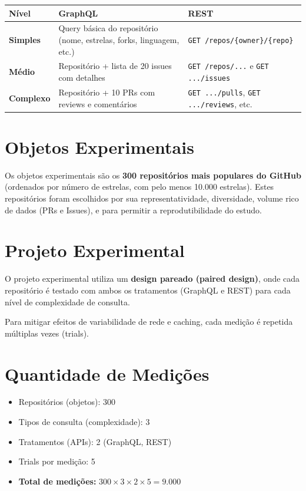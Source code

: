 \documentclass[12pt, a4paper]{article}
\begin{document}
\begin{table}[h]
\centering
\begin{tabularx}{\textwidth}{l X X}
\toprule
\textbf{Nível} & \textbf{GraphQL} & \textbf{REST} \\
\midrule
\textbf{Simples} & Query básica do repositório (nome, estrelas, forks, linguagem, etc.) & \texttt{GET /repos/\{owner\}/\{repo\}} \\
\textbf{Médio} & Repositório + lista de 20 issues com detalhes & \texttt{GET /repos/...} e \texttt{GET .../issues} \\
\textbf{Complexo} & Repositório + 10 PRs com reviews e comentários & \texttt{GET .../pulls}, \texttt{GET .../reviews}, etc. \\
\bottomrule
\end{tabularx}
\end{table}

\section{Objetos Experimentais}

Os objetos experimentais são os \textbf{300 repositórios mais populares do GitHub} (ordenados por número de estrelas, com pelo menos 10.000 estrelas). Estes repositórios foram escolhidos por sua representatividade, diversidade, volume rico de dados (PRs e Issues), e para permitir a reprodutibilidade do estudo.

\section{Projeto Experimental}

O projeto experimental utiliza um \textbf{design pareado (paired design)}, onde cada repositório é testado com ambos os tratamentos (GraphQL e REST) para cada nível de complexidade de consulta.

Para mitigar efeitos de variabilidade de rede e caching, cada medição é repetida múltiplas vezes (trials).

\section{Quantidade de Medições}

\begin{itemize}
    \item Repositórios (objetos): 300
    \item Tipos de consulta (complexidade): 3
    \item Tratamentos (APIs): 2 (GraphQL, REST)
    \item Trials por medição: 5
    \item \textbf{Total de medições:} $300 \times 3 \times 2 \times 5 = 9.000$
\end{itemize}
\end{document}

